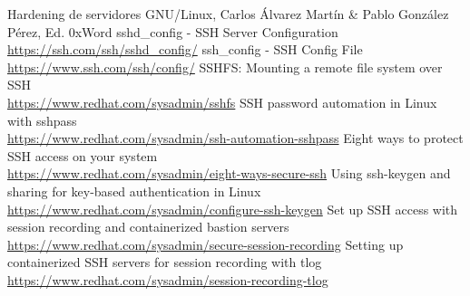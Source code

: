 \documentclass[a4paper, 11pt, titlepage]{article}
\begin{document}
\newpage
\begin{thebibliography}{X}
    \bibitem{} Hardening de servidores GNU/Linux, Carlos Álvarez Martín \& Pablo González Pérez, Ed. 0xWord
    \bibitem{} sshd\_config - SSH Server Configuration \\ \url{https://ssh.com/ssh/sshd_config/}
    \bibitem{} ssh\_config - SSH Config File \\ \url{https://www.ssh.com/ssh/config/}
    \bibitem{} SSHFS: Mounting a remote file system over SSH \\ \url{https://www.redhat.com/sysadmin/sshfs}
    \bibitem{} SSH password automation in Linux with sshpass \\ \url{https://www.redhat.com/sysadmin/ssh-automation-sshpass}
    \bibitem{} Eight ways to protect SSH access on your system \\ \url{https://www.redhat.com/sysadmin/eight-ways-secure-ssh}
    \bibitem{} Using ssh-keygen and sharing for key-based authentication in Linux \\ \url{https://www.redhat.com/sysadmin/configure-ssh-keygen}
    \bibitem{} Set up SSH access with session recording and containerized bastion servers \\ \url{https://www.redhat.com/sysadmin/secure-session-recording}
    \bibitem{} Setting up containerized SSH servers for session recording with tlog \\ \url{https://www.redhat.com/sysadmin/session-recording-tlog}
\end{thebibliography}
\end{document}
